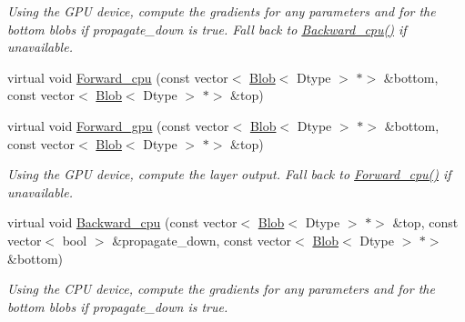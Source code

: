 \begin{DoxyCompactItemize}
\begin{DoxyCompactList}\small\item\em Using the G\+PU device, compute the gradients for any parameters and for the bottom blobs if propagate\+\_\+down is true. Fall back to \mbox{\hyperlink{classcaffe_1_1_dropout_layer_afd94f3c55768f4847956c01bce88f9c1}{Backward\+\_\+cpu()}} if unavailable. \end{DoxyCompactList}\item 
virtual void \mbox{\hyperlink{classcaffe_1_1_dropout_layer_a91f6a1b9c2c36f93935320400768c436}{Forward\+\_\+cpu}} (const vector$<$ \mbox{\hyperlink{classcaffe_1_1_blob}{Blob}}$<$ Dtype $>$ $\ast$$>$ \&bottom, const vector$<$ \mbox{\hyperlink{classcaffe_1_1_blob}{Blob}}$<$ Dtype $>$ $\ast$$>$ \&top)
\item 
\mbox{\label{classcaffe_1_1_dropout_layer_aec676b1d329ed969ea71b32d595e6201}} 
virtual void \mbox{\hyperlink{classcaffe_1_1_dropout_layer_aec676b1d329ed969ea71b32d595e6201}{Forward\+\_\+gpu}} (const vector$<$ \mbox{\hyperlink{classcaffe_1_1_blob}{Blob}}$<$ Dtype $>$ $\ast$$>$ \&bottom, const vector$<$ \mbox{\hyperlink{classcaffe_1_1_blob}{Blob}}$<$ Dtype $>$ $\ast$$>$ \&top)
\begin{DoxyCompactList}\small\item\em Using the G\+PU device, compute the layer output. Fall back to \mbox{\hyperlink{classcaffe_1_1_dropout_layer_af3d3f94306230950edf514e0fbb8f710}{Forward\+\_\+cpu()}} if unavailable. \end{DoxyCompactList}\item 
\mbox{\label{classcaffe_1_1_dropout_layer_aa7304acf7f8984e9d7ea55c45cbb0ebe}} 
virtual void \mbox{\hyperlink{classcaffe_1_1_dropout_layer_aa7304acf7f8984e9d7ea55c45cbb0ebe}{Backward\+\_\+cpu}} (const vector$<$ \mbox{\hyperlink{classcaffe_1_1_blob}{Blob}}$<$ Dtype $>$ $\ast$$>$ \&top, const vector$<$ bool $>$ \&propagate\+\_\+down, const vector$<$ \mbox{\hyperlink{classcaffe_1_1_blob}{Blob}}$<$ Dtype $>$ $\ast$$>$ \&bottom)
\begin{DoxyCompactList}\small\item\em Using the C\+PU device, compute the gradients for any parameters and for the bottom blobs if propagate\+\_\+down is true. \end{DoxyCompactList}\item 
\mbox{\label{classcaffe_1_1_dropout_layer_a018a322f4e9e2604d9d55d9c85512600}} 

\end{DoxyCompactItemize}
